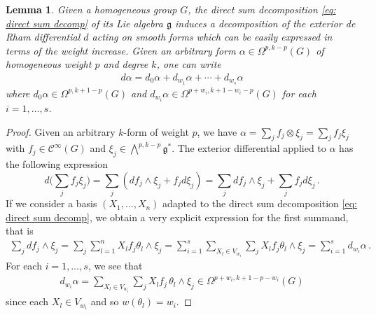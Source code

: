 \documentclass[dvipsnames]{amsart}
\newtheorem{lemma}[theorem]{Lemma}
\theoremstyle{definition}
\theoremstyle{definition}
\numberwithin{equation}{section}
\begin{document}
\begin{lemma}\label{lem: decomposing d according to weight increase}
    Given a homogeneous group $G$, the direct sum decomposition \eqref{eq: direct sum decomp} of its Lie algebra $\mathfrak{g}$ induces a decomposition of the exterior de Rham differential $d$ acting on smooth forms which can be easily expressed in terms of the weight increase. Given an arbitrary form $\alpha\in\Omega^{p,k-p}(G)$ of homogeneous weight $p$ and degree $k$, one can write
    \begin{align*}
        d\alpha=d_0\alpha+d_{w_1}\alpha+\cdots+d_{w_s}\alpha
    \end{align*}
    where $d_0\alpha\in\Omega^{p,k+1-p}(G)$ and $d_{w_i}\alpha\in\Omega^{p+w_i,k+1-w_i-p}(G)$ for each $i=1,\ldots,s$.
\end{lemma}
\begin{proof}
    Given an arbitrary $k$-form of weight $p$, we have $\alpha=\sum_{j}f_j\otimes\xi_j=\sum_jf_j\xi_j$ with $f_j\in \mathcal{C}^\infty(G)$ and $\xi_j\in\bigwedge^{p,k-p}\mathfrak{g}^\ast$. The exterior differential applied to $\alpha$ has the following expression\begin{equation}\label{explicit formula exterior derivative}
d\bigg(\sum_jf_j\xi_j\bigg)=\sum_j\left(df_j\wedge\xi_j+f_jd\xi_j\right)=\sum_jdf_j\wedge\xi_j+\sum_jf_jd\xi_j\,.
\end{equation}
If we consider a basis $(X_1,\ldots,X_n)$ adapted to the direct sum decomposition \eqref{eq: direct sum decomp}, we obtain a very explicit expression for the first summand, that is
\begin{align*}
    \sum_jdf_j\wedge\xi_j=\sum_j\sum_{l=1}^nX_lf_j\theta_l\wedge\xi_j=\sum_{i=1}^s\sum_{X_l\in V_{w_i}}\sum_jX_lf_j\theta_l\wedge\xi_j=\sum_{i=1}^s d_{w_i}\alpha\,.
\end{align*}
For each $i=1,\ldots,s$, we see that
\begin{align*}
    d_{w_i}\alpha=\sum_{X_l\in V_{w_i}}\sum_jX_lf_j\,\theta_l\wedge\xi_j\in\Omega^{p+w_i,k+1-p-w_i}(G)
\end{align*}
since each $X_l\in V_{w_i}$ and so $w(\theta_l)=w_i$.


\end{proof}
\end{document}
